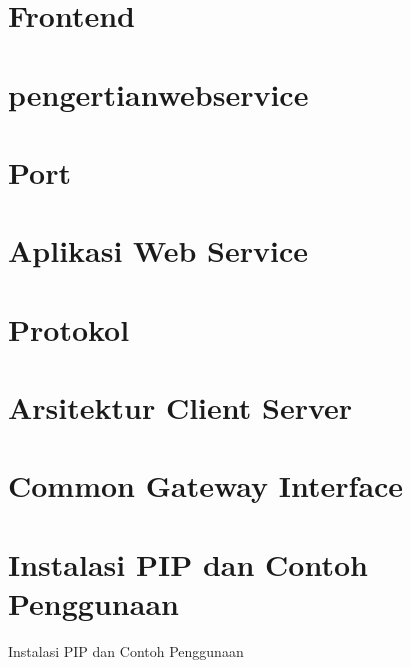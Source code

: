 \documentclass{wileySix}
\begin{document}
\chapter[Frontend]
{Frontend}


\chapter[Pengertian Web Service]
{pengertianwebservice}


\chapter[Port]
{Port}



\chapter[Aplikasi Web Service]
{Aplikasi Web Service}


\chapter[Protokol]
{Protokol}


\chapter[Arsitektur Client Server]
{Arsitektur Client Server}


\chapter[Common Gateway Interface]
{Common Gateway Interface}


\chapter{Instalasi PIP dan Contoh Penggunaan}
{Instalasi PIP dan Contoh Penggunaan}


%
\end{document}
